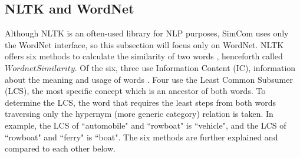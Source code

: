 \documentclass{article}
\begin{document}
\subsection{NLTK and WordNet}
Although NLTK is an often-used library for NLP purposes, SimCom uses only the WordNet interface, so this subsection will focus only on WordNet. 
NLTK offers six methods to calculate the similarity of two words \citep{pedersen2004wordnet}, henceforth called $\textit{WordnetSimilarity}$. Of the six, three use Information Content (IC), information about the meaning and usage of words \cite{seco2004intrinsic}. Four use the Least Common Subsumer (LCS), the most specific concept which is an ancestor of both words. To determine the LCS, the word that requires the least steps from both words traversing only the hypernym (more generic category) relation is taken. In example, the LCS of ``automobile" and ``rowboat" is ``vehicle", and the LCS of ``rowboat" and ``ferry" is ``boat". The six methods are further explained and compared to each other below.
\end{document}

